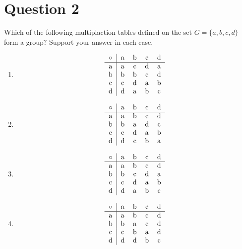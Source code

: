 \documentclass[openany]{report}
\begin{document}
\section{Question 2}
Which of the following multiplaction tables defined on the set $G = \{a,b,c,d\}$ form a group? Support your answer in each case. 
\begin{multicols}{2}
    \begin{enumerate}[label=(\alph*)]
        \item \[\begin{tabular}{c|cccc}
            $\circ$ & a & b & c & d \\
            \hline
            a & a & c & d & a \\
            b & b & b & c & d\\
            c & c & d & a & b\\
            d & d & a & b & c 
        \end{tabular}\]
        \item \[\begin{tabular}{c|cccc}
            $\circ$ & a & b & c & d \\
            \hline
            a & a & b & c & d \\
            b & b & a & d & c\\
            c & c & d & a & b\\
            d & d & c & b & a 
        \end{tabular}\]
        \item \[\begin{tabular}{c|cccc}
            $\circ$ & a & b & c & d \\
            \hline
            a & a & b & c & d \\
            b & b & c & d & a\\
            c & c & d & a & b\\
            d & d & a & b & c 
        \end{tabular}\]
        \item \[\begin{tabular}{c|cccc}
            $\circ$ & a & b & c & d \\
            \hline
            a & a & b & c & d \\
            b & b & a & c & d\\
            c & c & b & a & d\\
            d & d & d & b & c 
        \end{tabular}\]
    \end{enumerate}
\end{multicols}
\end{document}
